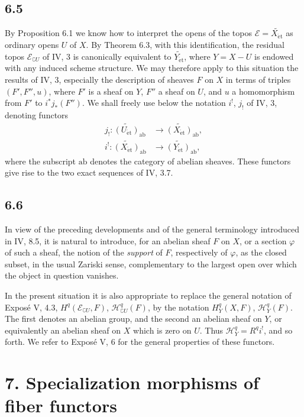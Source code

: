 \documentclass[11pt]{article}
\newcommand{\E}{\mathcal{E}}
\newcommand{\ab}{\mathrm{ab}}
\newcommand{\et}{\mathrm{\acute{e}t}}
\begin{document}
\subsection*{6.5}
By Proposition 6.1 we know how to interpret the opens of the topos \(\E=\widetilde{X_{\et}}\) as ordinary opens \(U\) of \(X\). By Theorem 6.3, with this identification, the residual topos \(\E_{\complement U}\) of IV, 3 is canonically equivalent to \(\widetilde{Y_{\et}}\), where \(Y=X-U\) is endowed with any induced scheme structure. We may therefore apply to this situation the results of IV, 3, especially the description of sheaves \(F\) on \(X\) in terms of triples \((F',F'',u)\), where \(F'\) is a sheaf on \(Y\), \(F''\) a sheaf on \(U\), and \(u\) a homomorphism from \(F'\) to \(i^*j_*(F'')\). We shall freely use below the notation \(i^!\), \(j_!\) of IV, 3, denoting functors
\[
\begin{aligned}
j_!:\widetilde{(U_{\et})}_{\ab}&\longrightarrow \widetilde{(X_{\et})}_{\ab},\\
i^!:\widetilde{(X_{\et})}_{\ab}&\longrightarrow \widetilde{(Y_{\et})}_{\ab},
\end{aligned}
\]
where the subscript \(\ab\) denotes the category of abelian sheaves. These functors give rise to the two exact sequences of IV, 3.7.

\subsection*{6.6}
In view of the preceding developments and of the general terminology introduced in IV, 8.5, it is natural to introduce, for an abelian sheaf \(F\) on \(X\), or a section \(\varphi\) of such a sheaf, the notion of the \emph{support} of \(F\), respectively of \(\varphi\), as the closed subset, in the usual Zariski sense, complementary to the largest open over which the object in question vanishes.

In the present situation it is also appropriate to replace the general notation of Expos\'e V, 4.3, \(H^q(\E_{\complement U},F)\), \(\mathcal H^q_{\complement U}(F)\), by the notation \(H^q_Y(X,F)\), \(\mathcal H^q_Y(F)\). The first denotes an abelian group, and the second an abelian sheaf on \(Y\), or equivalently an abelian sheaf on \(X\) which is zero on \(U\). Thus \(\mathcal H^q_Y=R^q i^!\), and so forth. We refer to Expos\'e V, 6 for the general properties of these functors.

\section*{7. Specialization morphisms of fiber functors}
\end{document}
